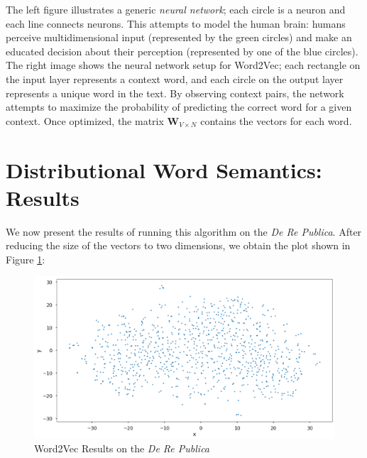 \documentclass[a4paper, 12pt,notitlepage]{article} %
\newenvironment{figurecenter}{%
	\setlength\topsep{-7pt}
	\setlength\parskip{-7pt}
	\singlespacing %
	\begin{center}
	}{%
	\end{center}
\vspace{-5pt}
}
\numberwithin{dummy}{subsection}
\numberwithin{dummy}{section}
\theoremstyle{named}
\theoremstyle{definition}
\theoremstyle{definition}
\newcommand{\bld}[1]{\boldsymbol{#1}}
\begin{document}
\noindent The left figure illustrates a generic \textit{neural network}; each circle is a neuron and each line connects neurons. This attempts to model the human brain: humans perceive multidimensional input (represented by the green circles) and make an educated decision about their perception (represented by one of the blue circles). The right image shows the neural network setup for Word2Vec; each rectangle on the input layer represents a context word, and each circle on the output layer represents a unique word in the text. By observing context pairs, the network attempts to maximize the probability of predicting the correct word for a given context. Once optimized, the matrix $\bld{W}_{V \times N}$ contains the vectors for each word.

\section{Distributional Word Semantics: Results}

We now present the results of running this algorithm on the \textit{De Re Publica}. After reducing the size of the vectors to two dimensions, we obtain the plot shown in Figure \ref{delta}:

\begin{figure}[H]
	\begin{figurecenter}
	\includegraphics[scale=0.7]{image8.png}
	\caption{Word2Vec Results on the \textit{De Re Publica}}
	\label{delta}
	\end{figurecenter}
\end{figure}
\end{document}
